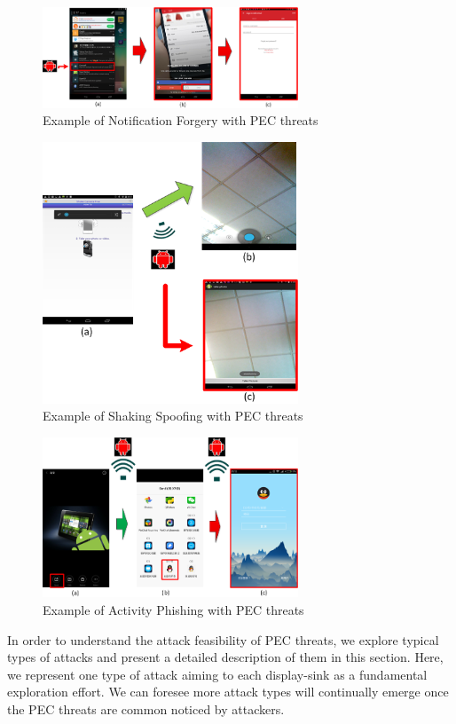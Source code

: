 \begin{figure}
\centering
\includegraphics[width = 3.0in]{pic3.png}
\caption{\label{}Example of Notification Forgery with PEC threats}
\end{figure}

\begin{figure}
\centering
\includegraphics[width = 3.0in]{pic4.png}
\caption{\label{}Example of Shaking Spoofing with PEC threats}
\end{figure}

\begin{figure}
\centering
\includegraphics[width = 3.0in]{pic5.png}
\caption{\label{}Example of Activity Phishing with PEC threats}
\end{figure}

In order to understand the attack feasibility of PEC threats, we explore typical types of attacks and present a detailed description of them in this section. Here, we represent one type of attack aiming to each display-sink as a fundamental exploration effort. We can foresee more attack types will continually emerge once the PEC threats are common noticed by attackers. 

